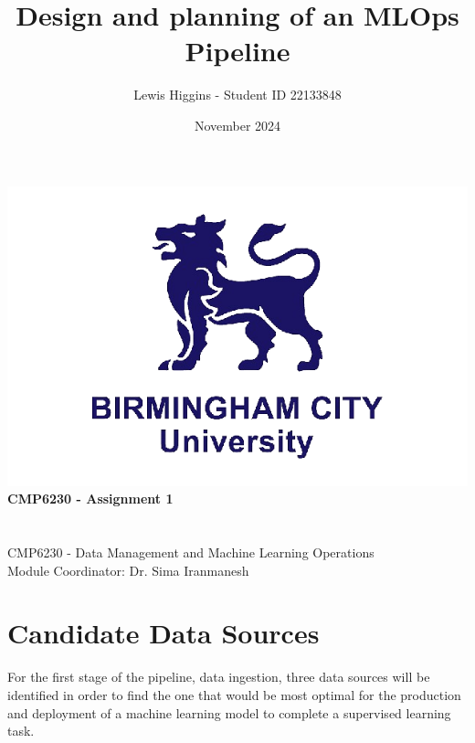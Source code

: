 \documentclass[12pt]{report}
\title{Design and planning of an MLOps Pipeline}
\author{Lewis Higgins - Student ID 22133848}
\date{November 2024}
\begin{document}
\makeatletter
\begin{titlepage}
    \begin{center}
        \includegraphics[width=0.7\linewidth]{BCU}\\[4ex]
        {\huge \bfseries CMP6230 - Assignment 1}\\[2ex]
        {\large \bfseries  \@title}\\[50ex]
        {\@author}\\[2ex]
        {CMP6230 - Data Management and Machine Learning Operations}\\[2ex]
        {Module Coordinator: Dr. Sima Iranmanesh}\\[10ex]
    \end{center}
\end{titlepage}
\makeatother
\thispagestyle{empty}
\newpage


\setcounter{page}{0}


\tableofcontents
\thispagestyle{empty}




\chapter{Candidate Data Sources}
For the first stage of the pipeline, data ingestion, three data sources will be identified in order to find 
the one that would be most optimal for the production and deployment of a machine learning model to complete 
a supervised learning task.
\end{document}
